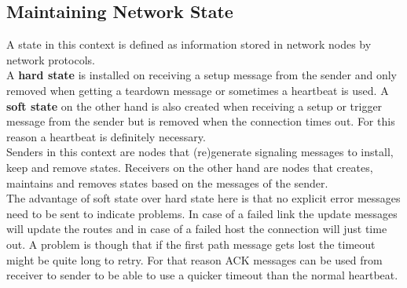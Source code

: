 \subsection{Maintaining Network State}
A state in this context is defined as information stored in network nodes by network protocols.\\
A \textbf{hard state} is installed on receiving a setup message from the sender and only removed when getting a teardown message or sometimes a heartbeat is used.
A \textbf{soft state} on the other hand is also created when receiving a setup or trigger message from the sender but is removed when the connection times out. 
For this reason a heartbeat is definitely necessary.\\
Senders in this context are nodes that (re)generate signaling messages to install, keep and remove states.
Receivers on the other hand are nodes that creates, maintains and removes states based on the messages of the sender.\\

The advantage of soft state over hard state here is that no explicit error messages need to be sent to indicate problems.
In case of a failed link the update messages will update the routes and in case of a failed host the connection will just time out.
A problem is though that if the first path message gets lost the timeout might be quite long to retry.
For that reason ACK messages can be used from receiver to sender to be able to use a quicker timeout than the normal heartbeat.
